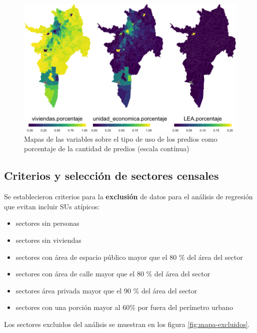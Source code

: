 \documentclass[12pt,a4paper,openany]{book}
\providecommand{\tightlist}{%
  \setlength{\itemsep}{0pt}\setlength{\parskip}{0pt}}
\theoremstyle{definition}
\theoremstyle{definition}
\theoremstyle{definition}
\theoremstyle{remark}
\begin{document}
\begin{figure}[H]

{\centering \includegraphics[width=0.8\linewidth]{tesis-unigis_files/figure-latex/mapas-usopredios-cont-1} 

}

\caption{Mapas de las variables sobre el tipo de uso de los predios como porcentaje de la cantidad de predios (escala contínua)}\label{fig:mapas-usopredios-cont}
\end{figure}

\subsection{Criterios y selección de sectores
censales}\label{criterios-y-selecciuxf3n-de-sectores-censales}

Se establecieron criterios para la \textbf{exclusión} de datos para el
análisis de regresión que evitan incluir SUs atípicos:

\begin{itemize}
\tightlist
\item
  sectores sin personas
\item
  sectores sin viviendas
\item
  sectores con área de espacio público mayor que el 80 \% del área del
  sector
\item
  sectores con área de calle mayor que el 80 \% del área del sector
\item
  sectores área privada mayor que el 90 \% del área del sector
\item
  sectores con una porción mayor al 60\% por fuera del perímetro urbano
\end{itemize}

Los sectores excluidos del análisis se muestran en los figura
\ref{fig:mapa-excluidos}.
\end{document}
